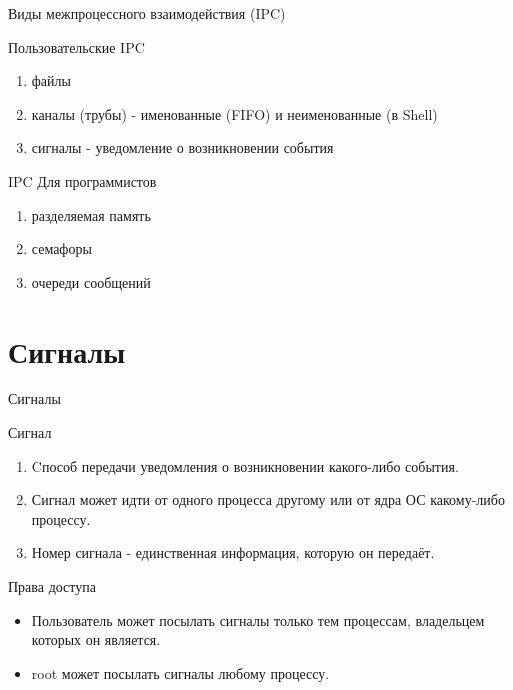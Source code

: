 \begin{frame}{Виды межпроцессного взаимодействия (IPC)}

  \begin{block}{Пользовательские IPC}
    \begin{enumerate}
      \item \alert{файлы}
      \item \alert{каналы (трубы)} - именованные (FIFO) и неименованные (в Shell)\pause
      \item \alert{сигналы} - уведомление о возникновении события
    \end{enumerate}
  \end{block}\pause

  \begin{block}{IPC Для программистов}
    \begin{enumerate}
      \item \alert{разделяемая память}
      \item \alert{семафоры}
      \item \alert{очереди сообщений}
    \end{enumerate}
  \end{block}

\end{frame}

\section{Сигналы}


\begin{frame}{Сигналы}
  \begin{block}{Сигнал}
    \begin{enumerate}
      \item Cпособ передачи уведомления о возникновении какого-либо события.
      \item Сигнал может идти от одного процесса другому или от ядра ОС какому-либо процессу.
      \item Номер сигнала - единственная информация, которую он передаёт.
    \end{enumerate}
  \end{block} \pause

  \begin{block}{Права доступа}
    \begin{itemize}
      \item Пользователь может посылать сигналы только тем процессам, владельцем которых он является.
      \item \alert{root} может посылать сигналы любому процессу.
    \end{itemize}
  \end{block}

\end{frame}

